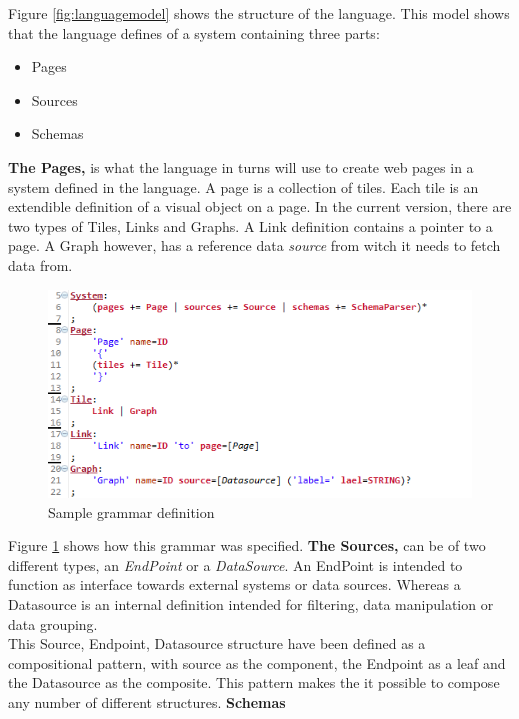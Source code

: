 Figure \ref{fig:languagemodel} shows the structure of the language.
This model shows that the language defines of a system containing three parts:
\begin{itemize}
\item Pages
\item Sources
\item Schemas
\end{itemize}
\textbf{The Pages,} is what the language in turns will use to create web pages in a system defined in the language.
A page is a collection of tiles. 
Each tile is an extendible definition of a visual object on a page.
In the current version, there are two types of Tiles, Links and Graphs.
A Link definition contains a pointer to a page. 
A Graph however, has a reference data \textit{source} from witch it needs to fetch data from.
\begin{figure}
\begin{center}
\includegraphics[width=\linewidth]{images/GrammaDefinition}
\end{center}
\caption{Sample grammar definition}
\label{fig:grammadefinition}
\end{figure}
Figure \ref{fig:grammadefinition} shows how this grammar was specified.
\textbf{The Sources, } can be of two different types, an \textit{EndPoint} or a \textit{DataSource}.
An EndPoint is intended to function as interface towards external systems or data sources. 
Whereas a Datasource is an internal definition intended for filtering, data manipulation or data grouping.\\
This Source, Endpoint, Datasource structure have been defined as a compositional pattern, with source as the component, the Endpoint as a leaf and the Datasource as the composite.
This pattern makes the it possible to compose any number of different structures.
\textbf{Schemas}
